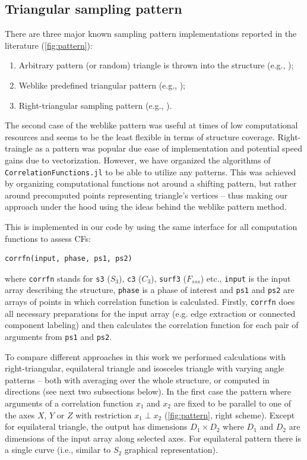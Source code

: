 \documentclass[reprint,amsmath,amssymb,aps,pre,showkeys,showpacs]{revtex4-1}
\newcommand{\code}[1]{\colorbox{light-gray}{\texttt{#1}}}
\begin{document}
\subsection{Triangular sampling pattern}
There are three major known sampling pattern implementations reported in the
literature (\cref{fig:pattern}):
\begin{enumerate}
  \item Arbitrary pattern (or random) triangle is thrown into the structure
    (e.g., \cite{malmir2018});
  \item Weblike predefined triangular pattern (e.g., \cite{SMITH1988176});
  \item Right-triangular sampling pattern (e.g.,
    \cite{dimitrakopoulos2010high}).
\end{enumerate}
The second case of the weblike pattern was useful at times of low computational
resources and seems to be the least flexible in terms of structure
coverage. Right-traingle as a pattern was popular due ease of implementation and
potential speed gains due to vectorization.  However, we have organized the
algorithms of \code{CorrelationFunctions.jl} to be able to utilize any patterns.
This was achieved by organizing computational functions not around a shifting
pattern, but rather around precomputed points representing triangle's vertices
-- thus making our approach under the hood using the ideas behind the weblike
pattern method.

This is implemented in our code by using the same interface for all computation
functions to assess CFs:
\begin{verbatim}
corrfn(input, phase, ps1, ps2)
\end{verbatim}
where \code{corrfn} stands for \code{s3} ($S_3$), \code{c3} ($C_3$),
\code{surf3} ($F_{sss}$) etc., \code{input} is the input array describing the
structure, \code{phase} is a phase of interest and \code{ps1} and \code{ps2} are
arrays of points in which correlation function is calculated. Firstly,
\code{corrfn} does all necessary preparations for the input array (e.g. edge
extraction or connected component labeling) and then calculates the correlation
function for each pair of arguments from \code{ps1} and \code{ps2}.

To compare different approaches in this work we performed calculations with
right-triangular\cite{dimitrakopoulos2010high,malmir2018}, equilateral triangle
and isosceles triangle with varying angle \cite{SMITH1988176,malmir2018}
patterns -- both with averaging over the whole structure, or computed in
directions (see next two subsections below). In the first case the pattern where
arguments of a correlation function $x_1$ and $x_2$ are fixed to be parallel to
one of the axes $X$, $Y$ or $Z$ with restriction $x_1 \perp x_2$
(\cref{fig:pattern}, right scheme). Except for equilateral triangle, the output
has dimensions $D_1 \times D_2$ where $D_1$ and $D_2$ are dimensions of the
input array along selected axes. For equilateral pattern there is a single curve
(i.e., similar to $S_2$ graphical representation).
\end{document}
